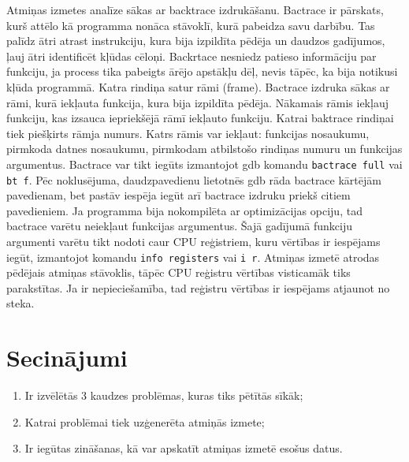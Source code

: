 Atmiņas izmetes analīze sākas ar backtrace izdrukāšanu. 
Bactrace ir pārskats, kurš attēlo kā programma nonāca stāvoklī, kurā pabeidza savu darbību.
Tas palīdz ātri atrast instrukciju, kura bija izpildīta pēdēja un daudzos gadījumos, ļauj ātri identificēt kļūdas cēloņi.
Backrtace nesniedz patieso informāciju par funkciju, ja process tika pabeigts ārējo apstākļu dēļ, nevis tāpēc, ka bija notikusi kļūda programmā.
Katra rindiņa satur rāmi (frame). Bactrace izdruka sākas ar rāmi, kurā iekļauta funkcija, kura bija izpildīta pēdēja. 
Nākamais rāmis iekļauj funkciju, kas izsauca iepriekšējā rāmī iekļauto funkciju.
Katrai baktrace rindiņai tiek piešķirts rāmja numurs. Katrs rāmis var iekļaut: funkcijas nosaukumu, pirmkoda datnes nosaukumu, pirmkodam atbilstošo rindiņas numuru un funkcijas argumentus. 
Bactrace var tikt iegūts izmantojot gdb komandu \texttt{bactrace full} vai \texttt{bt f}. 
Pēc noklusējuma, daudzpavedienu lietotnēs gdb  rāda bactrace kārtējām pavedienam, bet pastāv iespēja iegūt arī bactrace izdruku priekš citiem pavedieniem.
Ja programma bija nokompilēta ar optimizācijas opciju, tad bactrace varētu neiekļaut funkcijas argumentus.
Šajā gadījumā funkciju argumenti varētu tikt nodoti caur CPU reģistriem, kuru vērtības ir iespējams iegūt, izmantojot komandu \texttt{info registers} vai \texttt{i r}.
Atmiņas izmetē atrodas pēdējais atmiņas stāvoklis, tāpēc CPU reģistru vērtības visticamāk tiks parakstītas.
 Ja ir nepieciešamība, tad reģistru vērtības ir iespējams atjaunot no steka.

\section{Secinājumi}
\begin{enumerate}
\item Ir izvēlētās 3 kaudzes problēmas, kuras tiks pētītās sīkāk;
\item Katrai problēmai tiek uzģenerēta atmiņās izmete;
\item Ir iegūtas zināšanas, kā var apskatīt atmiņas izmetē esošus datus.
\end{enumerate}